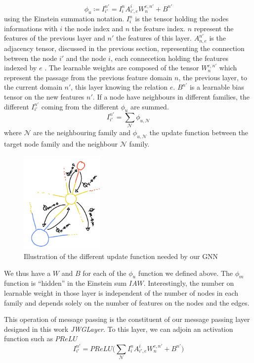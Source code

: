 \documentclass[../main.tex]{subfiles}
\begin{document}
\begin{equation}
  \phi_u \coloneq I^{n'}_{i'} = I^n_i A_{i',e}^{i} W_n^{e,n'} + B^{n'}
\end{equation}
using the Einstein summation notation. $I^{n}_i$ is the tensor holding the nodes informations with $i$ the node index and $n$ the feature index. $n$ represent the features of the previous layer and $n'$ the features of this layer. $A_{n,e}^{n'}$ is the adjacency tensor, discussed in the previous section, representing the connection between the node $i'$ and the node $i$, each connecetion holding the features indexed by $e$ . The learnable weights are composed of the tensor $W_n^{e,n'}$ which represent the passage from the previous feature domain $n$, the previous layer, to the current domain $n'$, this layer knowing the relation $e$. $B^{n'}$ is a learnable bias tensor on the new features $n'$.
If a node have neighbours in different families, the different $I^{n'}_{i'}$ coming from the different $\phi_u$ are summed.
\begin{equation}
  I^{n'}_{i'} = \sum_\mathcal{N} \phi_{u,\mathcal{N}}
\end{equation}
where $\mathcal{N}$ are the neighbouring family and $\phi_{u,\mathcal{N}}$ the update function between the target node family and the neighbour $\mathcal{N}$ family.

\begin{figure}
  \centering
  \includegraphics[height=5cm]{images/jgnn/mp_illus.png}
  \caption{Illustration of the different update function needed by our GNN}
  \label{fig:jgnn:mp_ill}
\end{figure}

We thus have a $W$ and $B$ for each of the $\phi_u$ function we defined above. The $\phi_m$ function is ``hidden'' in the Einstein sum $IAW$. Interestingly, the number on learnable weight in those layer is independent of the number of nodes in each family and depends solely on the number of features on the nodes and the edges.

This operation of message passing is the constituent of our message passing layer designed in this work \textit{JWGLayer}. To this layer, we can adjoin an activation function such as $PReLU$
\begin{equation}
  I^{n'}_{i'} = PReLU\bigg(\sum_\mathcal{N} I^n_i A_{i',e}^{i} W_n^{e,n'} + B^{n'} \bigg)
\end{equation}
\end{document}
